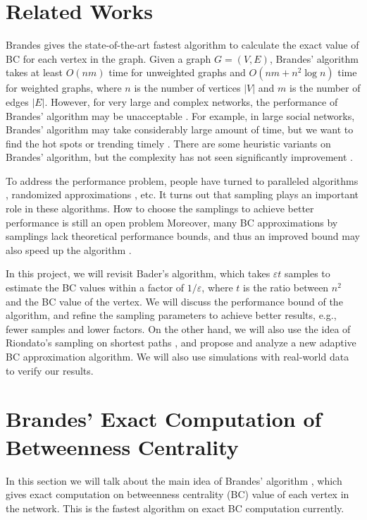 \documentclass[10pt]{article}
\begin{document}
\section{Related Works}
Brandes \cite{brandes2001faster, brandes2008variants} gives the state-of-the-art fastest algorithm to calculate the exact value of BC for each vertex in the graph. Given a graph $G=(V, E)$, Brandes' algorithm takes at least $O(nm)$ time for unweighted graphs and $O(nm + n^2 \log n)$ time for weighted graphs, where $n$ is the number of vertices $|V|$ and $m$ is the number of edges $|E|$. However, for very large and complex networks, the performance of Brandes' algorithm may be unacceptable \cite{bader2007approximating}. For example, in large social networks, Brandes' algorithm may take considerably large amount of time, but we want to find the hot spots or trending timely \cite{kourtellis2013identifying}. There are some heuristic variants on Brandes' algorithm, but the complexity has not seen significantly improvement \cite{puzis2012heuristics}. 

To address the performance problem, people have turned to paralleled algorithms \cite{madduri2009faster, bader2008graph, riondato2014fast}, randomized approximations \cite{bader2007approximating, geisberger2008better, riondato2014fast}, etc. It turns out that sampling plays an important role in these algorithms. How to choose the samplings to achieve better performance is still an open problem \cite{bader2007approximating} Moreover, many BC approximations by samplings lack theoretical performance bounds, and thus an improved bound may also speed up the algorithm \cite{geisberger2008better}. 

In this project, we will revisit Bader's algorithm, which takes $\varepsilon t$ samples to estimate the BC values within a factor of $1/\varepsilon$, where $t$ is the ratio between $n^2$ and the BC value of the vertex. We will discuss the performance bound of the algorithm, and refine the sampling parameters to achieve better results, e.g., fewer samples and lower factors. On the other hand, we will also use the idea of Riondato's sampling on shortest paths \cite{riondato2014fast}, and propose and analyze a new adaptive BC approximation algorithm. We will also use simulations with real-world data to verify our results.

\section{Brandes' Exact Computation of Betweenness Centrality}
In this section we will talk about the main idea of Brandes' algorithm \cite{brandes2001faster}, which gives exact computation on betweenness centrality (BC) value of each vertex in the network. This is the fastest algorithm on exact BC computation currently.
\end{document}
